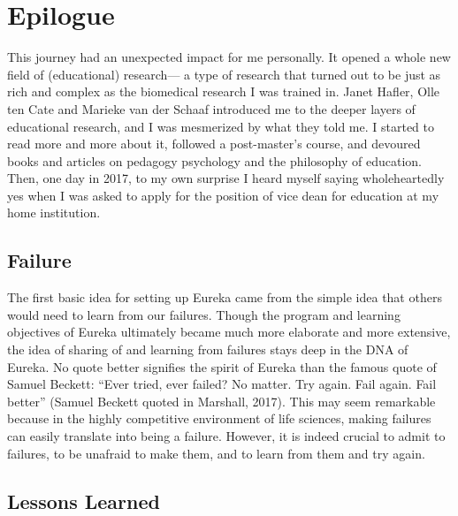 \documentclass[authordate, editorial]{jote-new-article}
\begin{document}
	\section{Epilogue}



	 This journey had an unexpected impact for me personally. It opened a whole new field of (educational) research— a type of research that turned out to be just as rich and complex as the biomedical research I was trained in. Janet Hafler, Olle ten Cate and Marieke van der Schaaf introduced me to the deeper layers of educational research, and I was mesmerized by what they told me. I started to read more and more about it, followed a post-master's course, and devoured books and articles on pedagogy psychology and the philosophy of education. Then, one day in 2017, to my own surprise I heard myself saying wholeheartedly yes when I was asked to apply for the position of vice dean for education at my home institution.







	\subsection{Failure}



	The first basic idea for setting up Eureka came from the simple idea that others would need to learn from our failures. Though the program and learning objectives of Eureka ultimately became much more elaborate and more extensive, the idea of sharing of and learning from failures stays deep in the DNA of Eureka. No quote better signifies the spirit of Eureka than the famous quote of Samuel Beckett: “Ever tried, ever failed? No matter. Try again. Fail again. Fail better” (Samuel Beckett quoted in Marshall, 2017). This may seem remarkable because in the highly competitive environment of life sciences, making failures can easily translate into being a failure. However, it is indeed crucial to admit to failures, to be unafraid to make them, and to learn from them and try again.







	\subsection{Lessons Learned}
\end{document}

